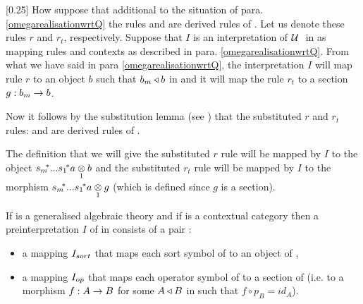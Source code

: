 [0.25]
\note
How suppose that additional to the situation of para. \ref{omegarealisationwrtQ} the rules 
 and   are derived rules of \gatUw. 
Let us denote these rules $r$ and $r_t$, respectively. Suppose that $I$ is an interpretation of $\gatUw$ in \catcw as mapping rules and contexts as described in para. \ref{omegarealisationwrtQ}.
From what we have said in para \ref{omegarealisationwrtQ}, the interpretation  $I$ will map rule $r$ to an object $b$ such that ${b_m \base b}$ in \catcw and it will map the rule $r_t$ to a section $g:b_m \morph b$.  

Now it follows by the substitution lemma (see \cite{Cartmell86})
that the substituted $r$ and $r_t$ rules: 
and   are derived rules of \gatU. 

The definition that we will give 
the substituted $r$ rule will be mapped by $I$ to the object $\smstar...\sonestar\crossx{a}{b}{1}$ and the substituted $r_t$ rule will
be mapped by $I$ to the morphism  $\smstar...\sonestar\crossx{a}{g}{1}$ (which is defined since $g$ is a section).

\newpage
\note
{}
If \gatU is a generalised algebraic theory  and if \catcw is a contextual category then
a preinterpretation $I$ of  \gatU in \catcw consists of a pair :
\begin{itemize}
\item a mapping $\Isort$ that maps each sort symbol of \gatUw to  an object of \catc,
\item a mapping $\Iop$ that maps each operator symbol of \gatUw to a section of \catcw (i.e. to a morphism $f: A \morph B$ for some 
$A \base B$ in \catcw such that $f \circ p_B=id_A$).
\end{itemize}

